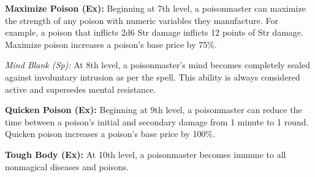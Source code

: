 {\textbf{Maximize Poison (Ex):} Beginning at 7th level, a poisonmaster can maximize the strength of any poison with numeric variables they manufacture. For example, a poison that inflicts 2d6 Str damage inflicts 12 points of Str damage. Maximize poison increases a poison's base price by 75\%.

\textit{Mind Blank (Sp):} At 8th level, a poisonmaster's mind becomes completely sealed against involuntary intrusion as per the  spell. This ability is always considered active and supersedes mental resistance.

\textbf{Quicken Poison (Ex):} Beginning at 9th level, a poisonmaster can reduce the time between a poison's initial and secondary damage from 1 minute to 1 round. Quicken poison increases a poison's base price by 100\%.

\textbf{Tough Body (Ex):} At 10th level, a poisonmaster becomes immune to all nonmagical diseases and poisons.
}